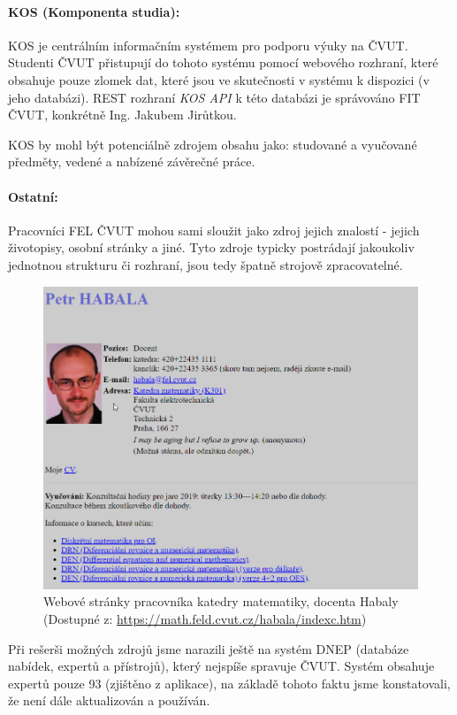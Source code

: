 \paragraph{KOS (Komponenta studia):} KOS je centrálním informačním systémem pro podporu výuky na ČVUT. Studenti ČVUT přistupují do tohoto systému pomocí webového rozhraní, které obsahuje pouze zlomek dat, které jsou ve skutečnosti v systému k dispozici (v jeho databázi). REST rozhraní \textit{KOS API} k této databázi je správováno FIT ČVUT, konkrétně Ing. Jakubem Jirůtkou.\par
 KOS by mohl být potenciálně zdrojem obsahu jako: studované a vyučované předměty, vedené a nabízené závěrečné práce.\par
\paragraph{Ostatní:} Pracovníci FEL ČVUT mohou sami sloužit jako zdroj jejich znalostí - jejich životopisy, osobní stránky a jiné. Tyto zdroje typicky postrádají jakoukoliv jednotnou strukturu či rozhraní, jsou tedy špatně strojově zpracovatelné.
 \begin{figure}[htbp!]
	\includegraphics[width=\linewidth]{img/personal-pages.png}
	\caption{Webové stránky pracovníka katedry matematiky, docenta Habaly (Dostupné z:  \url{https://math.feld.cvut.cz/habala/indexc.htm})}
	\label{fig:personal-pages}
\end{figure}
 Při rešerši možných zdrojů jsme narazili ještě na systém DNEP (databáze nabídek, expertů a přístrojů), který nejspíše spravuje ČVUT. Systém obsahuje expertů pouze 93 (zjištěno z aplikace), na základě tohoto faktu jsme konstatovali, že není dále aktualizován a používán.

